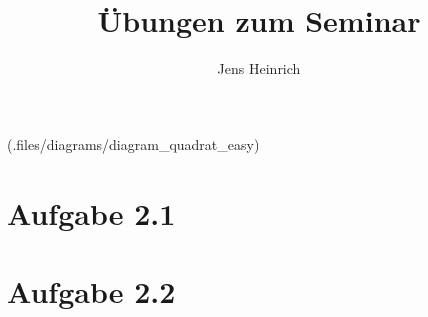 \documentclass{article}
\title{\"Ubungen zum Seminar \boldfont{Kategorientheorie} }
\author{Jens Heinrich}
\begin{document}
 		(.files/diagrams/diagram_quadrat_easy)		 

\section*{Aufgabe 2.1}
	


\newpage	
\section*{Aufgabe 2.2}
	
	
\end{document}
